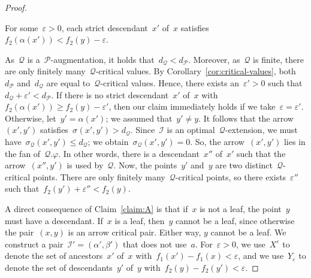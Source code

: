 \documentclass[a4paper,UKenglish, autoref, thm-restate, cleveref]{lipics-v2021}
\newcommand{\shift}[1]{\sigma_{#1}}
\newcommand{\resdist}[1]{d_{#1}}
\newcommand{\eps}{\varepsilon}
\renewcommand{\phi}{\varphi}
\newcommand{\I}{\mathcal{I}}
\renewcommand{\P}{\mathcal{P}}
\newcommand{\Q}{\mathcal{Q}}
\begin{document}
\begin{proof}
    \begin{claim}\label{claim:A}
        For some~$\eps > 0$, each strict descendant~$x'$ of~$x$ satisfies~$f_2(\alpha(x')) < f_2(y) - \eps$.
    \end{claim}
    \begin{claimproof}
    As~$\Q$ is a~$\P$-augmentation, it holds that~$\resdist{\Q} < \resdist{\P}$.
    Moreover, as~$\Q$ is finite, there are only finitely many~$\Q$-critical values.
    By Corollary~\ref{cor:critical-values}, both~$\resdist{\P}$ and~$\resdist{\Q}$ are equal to~$\Q$-critical values.
    Hence, there exists an~$\eps' > 0$ such that~$\resdist{\Q} + \eps' < \resdist{\P}$.
    If there is no strict descendant~$x'$ of~$x$ with~$f_2(\alpha(x')) \ge f_2(y) - \eps'$, then our claim immediately holds if we take~$\eps = \eps'$.
    Otherwise, let~$y' = \alpha(x')$; we assumed that~$y' \neq y$.
    It follows that the arrow~$(x', y')$ satisfies~$\shift{}(x', y') > \resdist{\Q}$.
    Since~$\I$ is an optimal~$\Q$-extension, we must have~$\shift{\Q}(x', y') \le \resdist{\Q}$; we obtain~$\shift{\Q}(x', y') = 0$.
    So, the arrow~$(x', y')$ lies in the fan of~$\Q.\phi$.
    In other words, there is a descendant~$x''$ of~$x'$ such that the arrow~$(x'', y')$ is used by~$\Q$.
    Now, the points~$y'$ and~$y$ are two distinct~$\Q$-critical points.
    There are only finitely many~$\Q$-critical points, so there exists~$\eps''$ such that~$f_2(y') + \eps'' < f_2(y)$.
    \end{claimproof}

    \noindent
    A direct consequence of Claim~\ref{claim:A} is that if~$x$ is not a leaf, the point~$y$ must have a descendant.
    If~$x$ is a leaf, then~$y$ cannot be a leaf, since otherwise the pair~$(x, y)$ is an arrow critical pair.
    Either way, $y$ cannot be a leaf.
    We construct a pair~$\I' = (\alpha', \beta')$ that does not use~$a$.
    For~$\eps > 0$, we use~$X^\eps$ to denote the set of ancestors~$x'$ of~$x$ with~$f_1(x') - f_1(x) < \eps$, and we use~$Y_\eps$ to denote the set of descendants~$y'$ of~$y$ with~$f_2(y) - f_2(y') < \eps$.
    

\end{proof}
\end{document}

